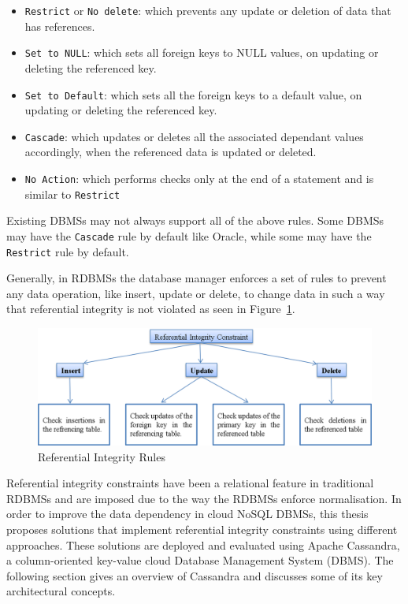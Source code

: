 	\begin{itemize}
	
		\item \texttt{Restrict} or \texttt{No delete}: which prevents any update or
		deletion of data that has references. 
		
		\item \texttt{Set to NULL}: which sets all foreign keys to NULL values,   on
		updating or deleting the referenced key. 
		
		\item \texttt{Set to Default}: which sets all the foreign
		keys to a default value,   on updating or deleting the referenced key. 
		
		\item \texttt{Cascade}: which updates or deletes all the
		associated dependant values accordingly,   when the referenced data is updated or
		deleted. 
		
		\item \texttt{No Action}: which performs checks only at the end of a
		statement and is similar to \texttt{Restrict}
		
	\end{itemize}

Existing \acp{DBMS} may not always support all of the above rules.  Some \acp{DBMS} may
have the \texttt{Cascade} rule by default like Oracle,   while some may have the
\texttt{Restrict} rule by default.  

Generally,   in \acp{RDBMS} the database manager enforces a set of rules to
prevent any data operation,   like insert,   update or delete,   to change data
in such a way that referential integrity is not violated as seen in
Figure~\ref{f:RI}. 

	\begin{figure}[H]
		\centering
		\includegraphics[width=.8\textwidth]{./figure/Example/RI-Figure.png}
		\caption{Referential Integrity Rules}\label{f:RI}
	\end{figure}

Referential integrity constraints have been a relational feature in traditional
\acp{RDBMS} and are imposed due to the way the \acp{RDBMS} enforce
normalisation.
In order to improve the data dependency in cloud \ac{NoSQL} \acp{DBMS},   this
thesis proposes solutions that implement referential integrity constraints using
different approaches. These solutions are
deployed and evaluated using Apache Cassandra, a column-oriented key-value cloud
Database Management System (DBMS). The following section gives an overview of
Cassandra and discusses some of its key architectural concepts.

